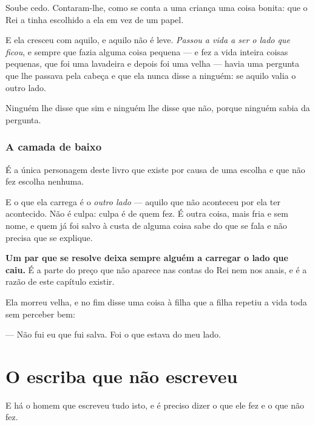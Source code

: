 \documentclass[livro.tex]{subfiles}
\begin{document}
Soube cedo. Contaram-lhe, como se conta a uma criança uma coisa bonita: que o Rei a tinha escolhido
a ela em vez de um papel.

\medskip

E ela cresceu com aquilo, e aquilo não é leve. \emph{Passou a vida a ser o lado que ficou}, e
sempre que fazia alguma coisa pequena --- e fez a vida inteira coisas pequenas, que foi uma
lavadeira e depois foi uma velha --- havia uma pergunta que lhe passava pela cabeça e que ela
nunca disse a ninguém: se aquilo valia o outro lado.

\medskip

Ninguém lhe disse que sim e ninguém lhe disse que não, porque ninguém sabia da pergunta.

\subsection*{A camada de baixo}

É a única personagem deste livro que existe por causa de uma escolha e que não fez escolha
nenhuma.

\medskip

E o que ela carrega é o \emph{outro lado} --- aquilo que não aconteceu por ela ter acontecido. Não
é culpa: culpa é de quem fez. É outra coisa, mais fria e sem nome, e quem já foi salvo à custa de
alguma coisa sabe do que se fala e não precisa que se explique.

\medskip

\textbf{Um par que se resolve deixa sempre alguém a carregar o lado que caiu.} É a parte do preço
que não aparece nas contas do Rei nem nos anais, e é a razão de este capítulo existir.

\medskip

Ela morreu velha, e no fim disse uma coisa à filha que a filha repetiu a vida toda sem perceber
bem:

\medskip

--- Não fui eu que fui salva. Foi o que estava do meu lado.

\chapter{O escriba que não escreveu}

E há o homem que escreveu tudo isto, e é preciso dizer o que ele fez e o que não fez.
\end{document}
